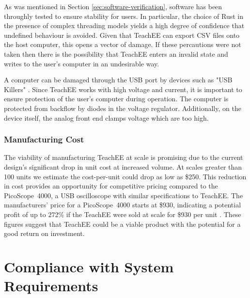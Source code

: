 \documentclass[letterpaper,11pt]{article}
\begin{document}
As was mentioned in Section \ref{sec:software-verification}, software has been
throughly tested to ensure stability for users. In particular, the choice of
Rust in the presence of complex threading models yields a high degree of
confidence that undefined behaviour is avoided. Given that TeachEE can export
CSV files onto the host computer, this opens a vector of damage. If these
percautions were not taken then there is the possibility that TeachEE enters an
invalid state and writes to the user's computer in an undesirable way.

A computer can be damaged through the USB port by devices such as "USB Killers"
\cite{usb-killer}. Since TeachEE works with high voltage and current, it is
important to ensure protection of the user's computer during operation. The
computer is protected from backflow by diodes in the voltage regulator.
Additionally, on the device itself, the analog front end clamps voltage which
are too high.

\subsubsection{Manufacturing Cost}

The viability of manufacturing TeachEE at scale is promising due to the current
design's significant drop in unit cost at increased volume.  At scales greater
than 100 units we estimate the cost-per-unit could drop as low as \$250. This
reduction in cost provides an opportunity for competitive pricing compared to
the PicoScope\textregistered~4000, a USB oscilloscope with similar
specifications to TeachEE. The manufacturers' price for a
PicoScope\textregistered~4000 starts at \$930, indicating a potential profit of
up to 272\% if the TeachEE were sold at scale for \$930 per unit
\cite{picoscope}. These figures suggest that TeachEE could be a viable product with
the potential for a good return on investment.

\section{Compliance with System Requirements} %
\end{document}
